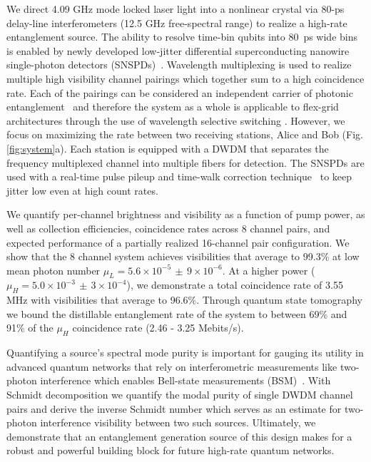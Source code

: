 \documentclass[11pt]{caltech_thesis} %
\begin{document}
We direct 4.09 GHz mode locked laser light into a nonlinear crystal via 80-ps delay-line interferometers (12.5 GHz free-spectral range) to realize a high-rate entanglement source. The ability to resolve time-bin qubits into 80~ps wide bins is enabled by newly developed low-jitter differential superconducting nanowire single-photon detectors (SNSPDs)~\autocite{Colangelo2023}. Wavelength multiplexing is used to realize multiple high visibility channel pairings which together sum to a high coincidence rate. Each of the pairings can be considered an independent carrier of photonic entanglement~\autocite{Djeylan2016,Wengerowsky2018} and therefore the system as a whole is applicable to flex-grid architectures through the use of wavelength selective switching \autocite{Appas2021,Alshowkan22Switching}. However, we focus on maximizing the rate between two receiving stations, Alice and Bob (Fig. \ref{fig:system}a). Each station is equipped with a DWDM that separates the frequency multiplexed channel into multiple fibers for detection. The SNSPDs are used with a real-time pulse pileup and time-walk correction technique~\autocite{Mueller2023} to keep jitter low even at high count rates.

We quantify per-channel brightness and visibility as a function of pump power, as well as collection efficiencies, coincidence rates across 8 channel pairs, and expected performance of a partially realized 16-channel pair configuration. We show that the 8 channel system achieves visibilities that average to 99.3\% at low mean photon number $\mu_{L} = 5.6{\times} 10^{-5}\,\pm\,9{\times} 10^{-6}$. At a higher power ($\mu_{H} = 5.0{\times} 10^{-3}\,\pm\,3{\times} 10^{-4}$), we demonstrate a total coincidence rate of 3.55 MHz with visibilities that average to 96.6\%. Through quantum state tomography we bound the distillable entanglement rate of the system to between 69\% and 91\% of the $\mu_{H}$ coincidence rate (2.46 - 3.25 Mebits/s).

Quantifying a source's spectral mode purity is important for gauging its utility in advanced quantum networks that rely on interferometric measurements like two-photon interference which enables Bell-state measurements (BSM)~\autocite{Valivarthi2020}.
With Schmidt decomposition we quantify the modal purity of single DWDM channel pairs and derive the inverse Schmidt number which serves as an estimate for two-photon interference visibility between two such sources. Ultimately, we demonstrate that an entanglement generation source of this design makes for a robust and powerful building block for future high-rate quantum networks.
\end{document}
